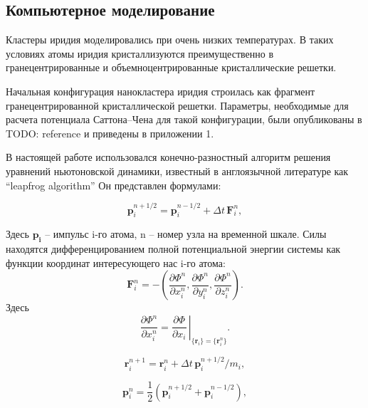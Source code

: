 \subsection{Компьютерное моделирование}
\label{sec:2b}

Кластеры иридия моделировались при очень низких температурах. %
В таких условиях атомы иридия кристаллизуются преимущественно в гранецентрированные
и объемноцентрированные кристаллические решетки.

Начальная конфигурация нанокластера иридия строилась как фрагмент гранецентрированной
кристаллической решетки. Параметры, необходимые для расчета потенциала Саттона--Чена
для такой конфигурации, были опубликованы в TODO: reference и приведены в приложении 1. 

В настоящей работе использовался конечно-разностный алгоритм решения уравнений ньютоновской динамики,
известный в англоязычной литературе как ``leapfrog algorithm''%
Он представлен формулами:

\begin{equation}
\label{LF1}
\mathbf{p}^{n+1/2}_i = \mathbf{p}^{n-1/2}_i + \Delta t \, \mathbf{F}^{n}_i,
\end{equation}

Здесь $\mathbf{p_i}$ -- импульс i-го атома, n -- номер узла на временной шкале. Силы находятся дифференцированием полной потенциальной энергии системы как функции координат интересующего нас i-го атома:
\begin{equation}
\label{LF:Force}
\mathbf{F}^{n}_i = - \left(\dfrac{\partial {\Phi}^n}{\partial x^{n}_i}, \dfrac{\partial {\Phi}^n}{\partial y^{n}_i}, \dfrac{\partial {\Phi}^n}{\partial z^{n}_i} \right).
\end{equation}
Здесь
\begin{equation}
\dfrac{\partial {\Phi}^n}{\partial x^{n}_i} = \left. \dfrac{\partial \Phi}{\partial x_i} \, \right|_{\{\mathbf{r}_i\} = \{\mathbf{r}^{n}_i\}}.
\end{equation}

\begin{equation}
\label{LF2}
\mathbf{r}^{n+1}_i = \mathbf{r}^{n}_i + \Delta t \, \mathbf{p}^{n+1/2}_i/m_i,
\end{equation}

\begin{equation}
\label{LF3}
\mathbf{p}^{n}_i = \dfrac{1}{2} \left(\mathbf{p}^{n+1/2}_i +
\mathbf{p}^{n-1/2}_i \right),
\end{equation}

